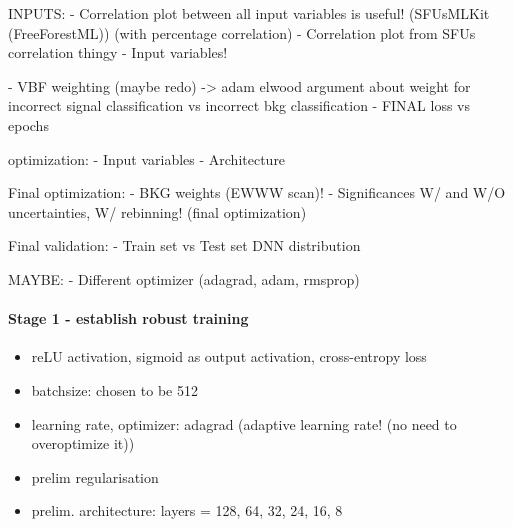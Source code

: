 INPUTS:
- Correlation plot between all input variables is useful! (SFUsMLKit (FreeForestML)) (with percentage correlation)
- Correlation plot from SFUs correlation thingy
- Input variables!

-  VBF weighting (maybe redo) -> adam elwood argument about weight for incorrect signal classification vs incorrect bkg classification
-  FINAL loss vs epochs

optimization: 
- Input variables
- Architecture

Final optimization:
-  BKG weights (EWWW scan)!
-  Significances W/ and W/O uncertainties, W/ rebinning! (final optimization)

Final validation:
- Train set vs Test set DNN distribution


MAYBE:
-  Different optimizer (adagrad, adam, rmsprop)




\paragraph{Stage 1 - establish robust training}
\begin{itemize}
    \item reLU activation, sigmoid as output activation, cross-entropy loss
    \item batchsize: chosen to be 512
    \item learning rate, optimizer: adagrad (adaptive learning rate! (no need to overoptimize it))
    \item prelim regularisation
    \item prelim. architecture: layers = 128, 64, 32, 24, 16, 8
\end{itemize}

